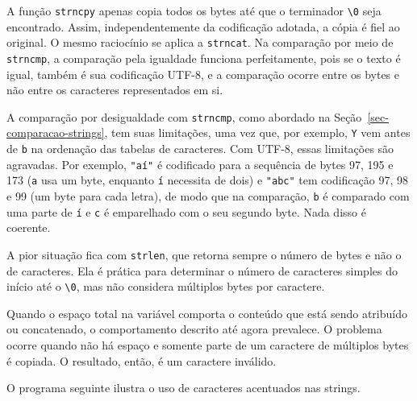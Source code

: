 \documentclass[
  11pt,
  a4paper,
]{scrbook}
\begin{document}
A função \texttt{strncpy} apenas copia todos os bytes até que o
terminador \texttt{\textbackslash{}0} seja encontrado. Assim,
independentemente da codificação adotada, a cópia é fiel ao original. O
mesmo raciocínio se aplica a \texttt{strncat}. Na comparação por meio de
\texttt{strncmp}, a comparação pela igualdade funciona perfeitamente,
pois se o texto é igual, também é sua codificação UTF-8, e a comparação
ocorre entre os bytes e não entre os caracteres representados em si.

A comparação por desigualdade com \texttt{strncmp}, como abordado na
Seção~\ref{sec-comparacao-strings}, tem suas limitações, uma vez que,
por exemplo, \texttt{Y} vem antes de \texttt{b} na ordenação das tabelas
de caracteres. Com UTF-8, essas limitações são agravadas. Por exemplo,
\texttt{"aí"} é codificado para a sequência de bytes 97, 195 e 173
(\texttt{a} usa um byte, enquanto \texttt{í} necessita de dois) e
\texttt{"abc"} tem codificação 97, 98 e 99 (um byte para cada letra), de
modo que na comparação, \texttt{b} é comparado com uma parte de
\texttt{í} e \texttt{c} é emparelhado com o seu segundo byte. Nada disso
é coerente.

A pior situação fica com \texttt{strlen}, que retorna sempre o número de
bytes e não o de caracteres. Ela é prática para determinar o número de
caracteres simples do início até o \texttt{\textbackslash{}0}, mas não
considera múltiplos bytes por caractere.

Quando o espaço total na variável comporta o conteúdo que está sendo
atribuído ou concatenado, o comportamento descrito até agora prevalece.
O problema ocorre quando não há espaço e somente parte de um caractere
de múltiplos bytes é copiada. O resultado, então, é um caractere
inválido.

O programa seguinte ilustra o uso de caracteres acentuados nas strings.
\end{document}
